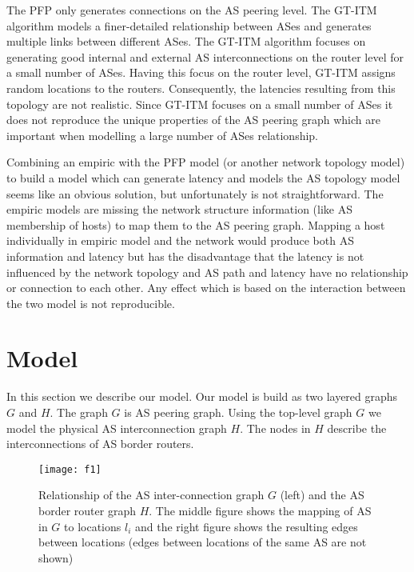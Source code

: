 \documentclass{sig-alternate-10pt}
\begin{document}
The PFP only generates connections on the AS peering level. The GT-ITM algorithm \cite{gtitm} models a finer-detailed relationship between ASes and generates multiple links between different ASes. The GT-ITM algorithm focuses on generating good internal and external AS interconnections on the router level for a small number of ASes. Having this focus on the router level, GT-ITM assigns random locations to the routers. Consequently, the latencies resulting from this topology are not realistic. Since GT-ITM focuses on a small number of ASes it does not reproduce the unique properties of the AS peering graph which are important when modelling a large number of ASes relationship. 

Combining an empiric with the PFP model (or another network topology model) to build a model which can generate latency and models the AS topology model seems like an obvious solution, but unfortunately is not straightforward. The empiric models are missing the network structure information (like AS membership of hosts) to map them to the AS peering graph. Mapping a host individually in empiric model and the network would produce both AS information and latency but has the disadvantage that the latency is not influenced by the network topology and AS path and latency have no relationship or connection to each other. Any effect which is based on the interaction between the two model is not reproducible.

 



\section{Model}
\label{sec:model}
In this section we describe our model. Our model is build as two layered graphs $G$ and $H$. The graph $G$ is AS peering graph. Using the top-level graph $G$ we model the physical AS interconnection graph $H$. The nodes in $H$ describe the interconnections of  AS border routers.

\begin{figure*}
{\centering
\texttt{[image: f1]}

}
\caption{Relationship of the AS inter-connection graph $G$ (left) and the AS border router graph $H$. The middle figure shows the mapping of AS in  $G$ to locations $l_i$ and the right figure shows the resulting edges between locations (edges between locations of the same AS are not shown)}
\label{figgundh}
\end{figure*}
\end{document}
